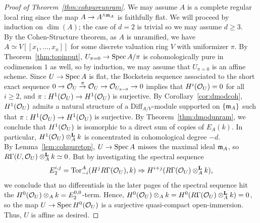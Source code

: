 \begin{proof}[Proof of Theorem~\ref{thm:cohpureunram}]
We may assume $A$ is a complete regular local ring since the map $A \to A^{\wedge \ideal{m}_A}$ is faithfully flat. We will proceed by induction on $\dim(A)$; 
the case of $d=2$ is trivial so we may assume $d \ge 3$.\\
\indent By the Cohen-Structure theorem, as $A$ is unramified, we have $A \simeq V[[x_1, \ldots, x_n]]$ for some discrete valuation ring $V$ with uniformizer $\pi$. 
By Theorem~\ref{thm:topinput}, $U_{\pi=0} \to \spec{A/\pi}$ is cohomologically pure in codimension $1$ as well, so by induction, we may assume that $U_{\pi=0}$ is an affine scheme. 
Since $U \to \spec{A}$ is flat, the Bockstein sequence associated to the short exact sequence $0 \to \cal{O}_U \stackrel{\pi}{\to} \cal{O}_U \to \cal{O}_{U_{\pi=0}} \to 0$ 
implies that $H^i(\cal{O}_U)=0$ for all $i\ge 2$, and $\pi: H^1(\cal{O}_U)\to H^1(\cal{O}_U)$ is surjective. By Corollary~\ref{cor:dmodcoh}, 
$H^1(\cal{O}_U)$ admits a natural structure of a $\mathrm{Diff}_{A/V}$-module supported on $\{\ideal{m}_A\}$ such that $\pi: H^1(\cal{O}_U) \to H^1(\cal{O}_U)$ is surjective.
By Theorem~\ref{thm:dmodunram}, we conclude that $H^1(\cal{O}_U)$ is isomorphic to a direct sum of copies of $E_A(k)$. In particular,
$H^1(\cal{O}_U) \otimesl_A k$ is concentrated in cohomological degree $-d$.\\
\indent By Lemma~\ref{lem:cohpuretop}, $U \to \spec{A}$ misses the maximal ideal $\ideal{m}_A$, so $R\Gamma(U, \cal{O}_U) \otimesl_A k \simeq 0$. 
But by investigating the spectral sequence 
\[E_2^{i,j} = \mathrm{Tor}_{-i}^A(H^jR\Gamma(\cal{O}_U), k) \Rightarrow H^{i+j}(R\Gamma(\cal{O}_U) \otimesl_A k),\]
we conclude that no differentials in the later pages of the spectral sequence hit the $H^0(\cal{O}_U) \otimes_A k=E_2^{0,0}$-term. 
Hence, $H^0(\cal{O}_U) \otimes_A k=H^0(R\Gamma(\cal{O}_U) \otimesl_A k) =0$, so the map $U \to \spec{H^0(\cal{O}_U)}$ is a surjective quasi-compact open-immersion. Thus, $U$ is affine as desired.
\end{proof}
